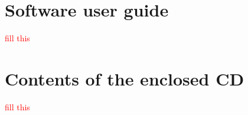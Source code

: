 \documentclass[12pt,a4paper,twoside]{report}
\let\openright=\cleardoublepage
\newcommand{\xxx}[1]{\textcolor{red}{#1}}
\begin{document}



\tableofcontents












\listoffigures

\listoftables


\appendix
\chapter{Software user guide}
\xxx{fill this}
\chapter{Contents of the enclosed CD}
\xxx{fill this}

\openright
\end{document}
